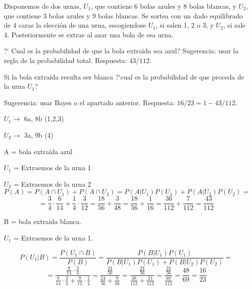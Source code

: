 \begin{problem}[2]Disponemos de dos urnas,
$U_1$, que contiene 6 bolas azules y 8 bolas blancas, y
$U_2$,
 que contiene
3 bolas azules y 9 bolas blancas. Se sortea con un dado equilibrado de 4 caras la elecci\'on de una
urna, escogiendose
$U_1$,
si salen 1,
2 o 3, y
$U_2$,
si sale 4. Posteriormente se extrae al azar una bola de
esa urna.

\ppart ?` Cual es la probabilidad de que la bola extraida sea azul?
Sugerencia: usar la regla de la probabilidad total. Respuesta: $43/112$.

\ppart  Si la bola extraida resulta ser blanca  ?`cual es la probabilidad de que proceda de la
urna
$U_1$?

Sugerencia: usar  Bayes o el apartado anterior. Respuesta:
$16/23 = 1 -  43/112$.
\solution
\begin{expla}

$U_1 \rightarrow$ 6a, 8b  (1,2,3)

$U_2 \rightarrow$ 3a, 9b  (4)
\end{expla}
\spart
A = bola extraída azul

$U_1$ = Extraemos de la urna 1

$U_2$ = Extraemos de la urna 2
\[
P(A) = P(A\cap U_1)+P(A\cap U_2) = P(A|U_1)P(U_1)+P(A|U_2)P(U_2)=
\]
\[
=\frac{3}{4}\cdot\frac{6}{14}+\frac{1}{4}\cdot\frac{3}{12}=\frac{18}{56}+\frac{3}{48}=\frac{18}{56}+\frac{1}{16}=\frac{36}{112}+\frac{7}{112}=\frac{43}{112}
\]

\spart
B = bola extraida blanca.

$U_1$ = Extraemos de la urna 1.

\[
P(U_1|B)= \frac{P(U_1 \cap B)}{P(B)} = \frac{P(B|U_1)P(U_1)}{P(B|U_1)P(U_1)+P(B|U_2)P(U_2)}=
\]
\[
=\frac{\frac{8}{14}\cdot\frac{3}{4}}{\frac{8}{14}\cdot\frac{3}{4}+\frac{9}{12}\cdot\frac{1}{4}}=\frac{\frac{24}{56}}{\frac{24}{56}+\frac{9}{48}}=\frac{\frac{24}{56}}{\frac{48}{112}+\frac{21}{112}}=\frac{\frac{24}{56}}{\frac{69}{112}}=\frac{48}{69}=\frac{16}{23}
\]

\end{problem}


